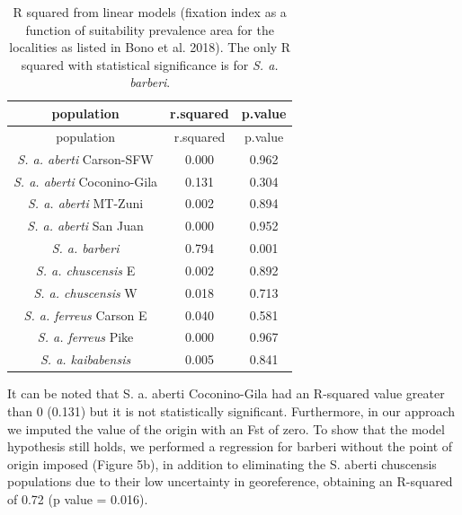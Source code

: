 \documentclass[
]{article}
\begin{document}
\begin{longtable}[]{@{}ccc@{}}
\caption{R squared from linear models (fixation index as a function of
suitability prevalence area for the localities as listed in Bono et al. 2018). The only R squared with statistical
significance is for \textit{S. a. barberi}.}\tabularnewline
\toprule\noalign{}
population & r.squared & p.value \\
\midrule\noalign{}
\endfirsthead
\toprule\noalign{}
population & r.squared & p.value \\
\midrule\noalign{}
\endhead
\bottomrule\noalign{}
\endlastfoot
\textit{S. a. aberti} Carson-SFW & 0.000 & 0.962 \\
\textit{S. a. aberti} Coconino-Gila & 0.131 & 0.304 \\
\textit{S. a. aberti} MT-Zuni & 0.002 & 0.894 \\
\textit{S. a. aberti} San Juan & 0.000 & 0.952 \\
\textit{S. a. barberi} & 0.794 & 0.001 \\
\textit{S. a. chuscensis} E & 0.002 & 0.892 \\
\textit{S. a. chuscensis} W & 0.018 & 0.713 \\
\textit{S. a. ferreus} Carson E & 0.040 & 0.581 \\
\textit{S. a. ferreus} Pike & 0.000 & 0.967 \\
\textit{S. a. kaibabensis} & 0.005 & 0.841 \\
\end{longtable}

It can be noted that S. a. aberti Coconino-Gila had an R-squared value
greater than 0 (0.131) but it is not statistically significant.
Furthermore, in our approach we imputed the value of the origin with an
Fst of zero. To show that the model hypothesis still holds, we performed
a regression for barberi without the point of origin imposed (Figure
5b), in addition to eliminating the S. aberti chuscensis populations due
to their low uncertainty in georeference, obtaining an R-squared of 0.72
(p value = 0.016).
\end{document}
